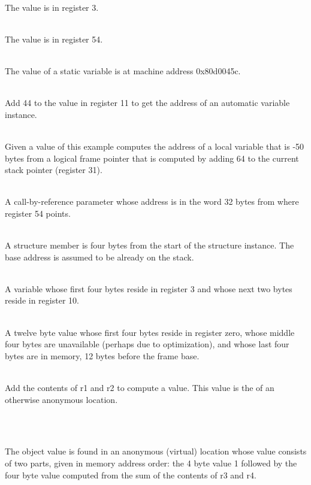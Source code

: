\newcommand{\descriptionitemnl}[1]
        {\vspace{0.3\baselineskip}\item[#1]\mbox{}\\\vspace{0.5\baselineskip}}
\begin{description}
\descriptionitemnl{\DWOPregthree}
The value is in register 3.

\descriptionitemnl{\DWOPregx{} 54}
The value is in register 54.

\descriptionitemnl{\DWOPaddr{} 0x80d0045c}
The value of a static variable is at machine address 0x80d0045c.

\descriptionitemnl{\DWOPbregeleven{} 44}
Add 44 to the value in register 11 to get the address of an automatic
variable instance.

\descriptionitemnl{\DWOPfbreg{} -50}
Given a \DWATframebase{} value of
 this example
computes the address of a local variable that is -50 bytes from a
logical frame pointer that is computed by adding 64 to the current
stack pointer (register 31).

\descriptionitemnl{\DWOPbregx{} 54 32 \DWOPderef}
A call-by-reference parameter whose address is in the word 32 bytes
from where register 54 points.

\descriptionitemnl{\DWOPplusuconst{} 4}
A structure member is four bytes from the start of the structure
instance. The base address is assumed to be already on the stack.

\descriptionitemnl{\DWOPregthree{} \DWOPpiece{} 4 \DWOPregten{} \DWOPpiece{} 2}
A variable whose first four bytes reside in register 3 and whose next
two bytes reside in register 10.

\descriptionitemnl{\DWOPregzero{} \DWOPpiece{} 4 \DWOPpiece{} 4 \DWOPfbreg{} -12 \DWOPpiece{} 4}
\vspace{-2\parsep}A twelve byte value whose first four bytes reside in register zero,
whose middle four bytes are unavailable (perhaps due to optimization),
and whose last four bytes are in memory, 12 bytes before the frame
base.

\descriptionitemnl{\DWOPbregone{} 0 \DWOPbregtwo{} 0 \DWOPplus{} \DWOPstackvalue{} }
Add the contents of r1 and r2 to compute a value. This value is the
 of an otherwise anonymous location.

\descriptionitemnl{\DWOPlitone{} \DWOPstackvalue{} \DWOPpiece{} 4 \DWOPbregthree{} 0 \DWOPbregfour{} 0}
\vspace{-3\parsep}\descriptionitemnl{
\hspace{0.5cm}\DWOPplus{} \DWOPstackvalue{} \DWOPpiece{} 4 }
The object value is found in an anonymous (virtual) location whose
value consists of two parts, given in memory address order: the 4 byte
value 1 followed by the four byte value computed from the sum of the
contents of r3 and r4.


\end{description}
